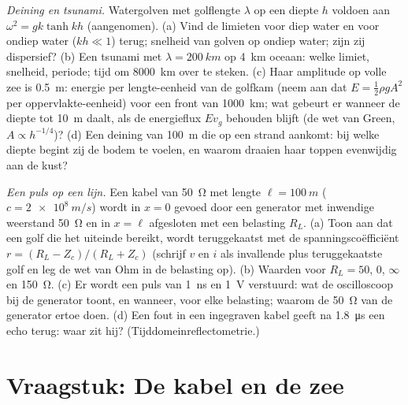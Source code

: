 \begin{exercise}[$\star\star\star$]\label{exo:b2:dispersion-wave-packets:11}
\emph{Deining en tsunami.} Watergolven met golflengte $\lambda$ op een
diepte $h$ voldoen aan $\omega^2 = gk\tanh kh$ (aangenomen). (a) Vind de
limieten voor diep water en voor ondiep water ($kh \ll 1$) terug; snelheid
van golven op ondiep water; zijn zij dispersief? (b) Een tsunami met
$\lambda = \qty{200}{km}$ op \qty{4}{km} oceaan: welke limiet, snelheid,
periode; tijd om \qty{8000}{km} over te steken. (c) Haar amplitude op volle
zee is \qty{0.5}{m}: energie per lengte-eenheid van de golfkam (neem aan dat
$E = \tfrac12\rho gA^2$ per oppervlakte-eenheid) voor een front van
\qty{1000}{km}; wat gebeurt er wanneer de diepte tot \qty{10}{m} daalt, als
de energieflux $Ev_g$ behouden blijft (de wet van Green,
$A \propto h^{-1/4}$)? (d) Een deining van \qty{100}{m} die op een strand
aankomt: bij welke diepte begint zij de bodem te voelen, en waarom draaien
haar toppen evenwijdig aan de kust?
\end{exercise}

\begin{exercise}[$\star\star\star$]\label{exo:b2:dispersion-wave-packets:12}
\emph{Een puls op een lijn.} Een kabel van \qty{50}{\ohm} met lengte
$\ell = \qty{100}{m}$ ($c = \qty{2e8}{m/s}$) wordt in $x = 0$ gevoed door
een generator met inwendige weerstand \qty{50}{\ohm} en in $x = \ell$
afgesloten met een belasting $R_L$. (a) Toon aan dat een golf die het
uiteinde bereikt, wordt teruggekaatst met de spanningscoëfficiënt
$r = (R_L - Z_c)/(R_L + Z_c)$ (schrijf $v$ en $i$ als invallende plus
teruggekaatste golf en leg de wet van Ohm in de belasting op). (b) Waarden
voor $R_L = 50$, $0$, $\infty$ en \qty{150}{\ohm}. (c) Er wordt een puls van
\qty{1}{ns} en \qty{1}{V} verstuurd: wat de oscilloscoop bij de generator
toont, en wanneer, voor elke belasting; waarom de \qty{50}{\ohm} van de
generator ertoe doen. (d) Een fout in een ingegraven kabel geeft na
\qty{1.8}{\micro s} een echo terug: waar zit hij?
(Tijddomeinreflectometrie.)
\end{exercise}

\section{Vraagstuk: De kabel en de zee}

